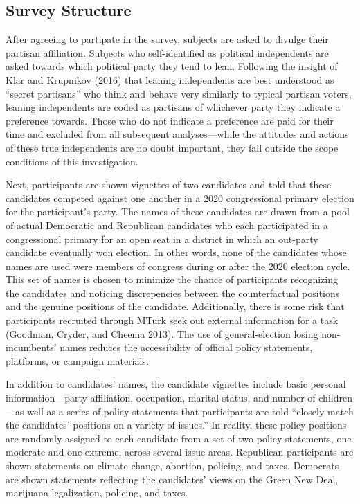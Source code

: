 \documentclass[
]{article}
\begin{document}
\hypertarget{survey-structure}{%
\subsection{Survey Structure}\label{survey-structure}}

After agreeing to partipate in the survey, subjects are asked to divulge their partisan affiliation. Subjects who self-identified as political independents are asked towards which political party they tend to lean. Following the insight of Klar and Krupnikov (2016) that leaning independents are best understood as ``secret partisans'' who think and behave very similarly to typical partisan voters, leaning independents are coded as partisans of whichever party they indicate a preference towards. Those who do not indicate a preference are paid for their time and excluded from all subsequent analyses---while the attitudes and actions of these true independents are no doubt important, they fall outside the scope conditions of this investigation.

Next, participants are shown vignettes of two candidates and told that these candidates competed against one another in a 2020 congressional primary election for the participant's party. The names of these candidates are drawn from a pool of actual Democratic and Republican candidates who each participated in a congressional primary for an open seat in a district in which an out-party candidate eventually won election. In other words, none of the candidates whose names are used were members of congress during or after the 2020 election cycle. This set of names is chosen to minimize the chance of participants recognizing the candidates and noticing discrepencies between the counterfactual positions and the genuine positions of the candidate. Additionally, there is some risk that participants recruited through MTurk seek out external information for a task (Goodman, Cryder, and Cheema 2013). The use of general-election losing non-incumbents' names reduces the accessibility of official policy statements, platforms, or campaign materials.

In addition to candidates' names, the candidate vignettes include basic personal information---party affiliation, occupation, marital status, and number of children---as well as a series of policy statements that participants are told ``closely match the candidates' positions on a variety of issues.'' In reality, these policy positions are randomly assigned to each candidate from a set of two policy statements, one moderate and one extreme, across several issue areas. Republican participants are shown statements on climate change, abortion, policing, and taxes. Democrats are shown statements reflecting the candidates' views on the Green New Deal, marijuana legalization, policing, and taxes.
\end{document}

